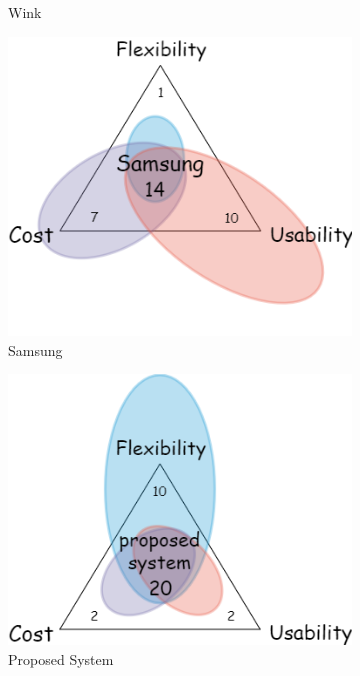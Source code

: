 \documentclass[12pt]{paper}
\begin{document}
\begin{figure}[H]
\begin{subfigure}[b]{.4\linewidth}
				\caption{Wink}
			\end{subfigure}
			\begin{subfigure}[b]{.4\linewidth}
				\includegraphics[width=\linewidth]{img/Samsung.png}
				\caption{Samsung}
			\end{subfigure}
			\begin{subfigure}[b]{.4\linewidth}
				\includegraphics[width=\linewidth]{img/proposed.png}
				\caption{Proposed System}
			\end{subfigure}
			\begin{subfigure}[b]{.4\linewidth}

\end{subfigure}
\end{figure}
\end{document}
